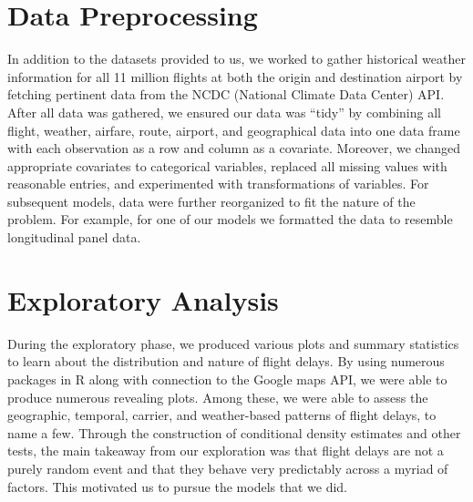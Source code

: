 \documentclass[12pt, a4paper, openany]{book}
\newcommand\tab[1][1cm]{\hspace*{#1}}
\begin{document}
	\section{Data Preprocessing}
\tab In addition to the datasets provided to us, we worked to gather historical weather information for all 11 million flights at both the origin and destination airport by fetching pertinent data from the NCDC (National Climate Data Center) API. After all data was gathered, we ensured our data was “tidy” by combining all flight, weather, airfare, route, airport, and geographical data into one data frame with each observation as a row and column as a covariate. Moreover, we changed appropriate covariates to categorical variables, replaced all missing values with reasonable entries, and experimented with transformations of variables. For subsequent models, data were further reorganized to fit the nature of the problem. For example, for one of our models we formatted the data to resemble longitudinal panel data. 
	\section{Exploratory Analysis}
\tab During the exploratory phase, we produced various plots and summary statistics to learn about the distribution and nature of flight delays. By using numerous packages in R along with connection to the Google maps API, we were able to produce numerous revealing plots. Among these, we were able to assess the geographic, temporal, carrier, and weather-based patterns of flight delays, to name a few. Through the construction of conditional density estimates and other tests, the main takeaway from our exploration was that flight delays are not a purely random event and that they behave very predictably across a myriad of factors. This motivated us to pursue the models that we did. 
\end{document}
